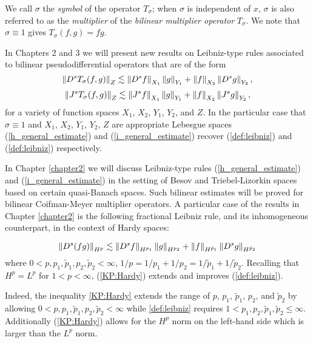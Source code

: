 We call $\sigma$ the \textit{symbol} of the operator $T_\sigma$; when $\sigma$ is independent of $x$, $\sigma$ is also referred to as the \textit{multiplier} of the \textit{bilinear multiplier operator} $T_\sigma$. We note that $\sigma \equiv 1$ gives $T_\sigma(f,g) = fg$. 


In Chapters 2 and 3 we will present new results on Leibniz-type rules associated to bilinear pseudodifferential operators that are of the form 
\begin{equation}\label{h_general_estimate}
\left\|D^s T_\sigma(f,g)\right\|_{Z} \lesssim \left\|D^sf\right\|_{X_1}\left\|g\right\|_{Y_1} + \left\|f\right\|_{X_2}\left\|D^s g\right\|_{Y_2} ,
\end{equation}
\begin{equation}\label{i_general_estimate}
\left\|J^sT_\sigma(f,g)\right\|_{Z} \lesssim \left\|J^sf\right\|_{X_1}\left\|g\right\|_{Y_1} + \left\|f\right\|_{X_2}\left\|J^sg\right\|_{Y_2} ,
\end{equation}
for a variety of function spaces $X_1$, $X_2$, $Y_1$, $Y_2$, and $Z$. In the particular case that $\sigma \equiv 1$ and $X_1$, $X_2$, $Y_1$, $Y_2$, $Z$ are appropriate Lebesgue spaces (\ref{h_general_estimate}) and (\ref{i_general_estimate}) recover (\ref{def:leibniz}) and (\ref{def:leibniz}) respectively.

In Chapter \ref{chapter2} we will discuss Leibniz-type rules (\ref{h_general_estimate}) and (\ref{i_general_estimate}) in the setting of Besov and Triebel-Lizorkin spaces based on certain quasi-Banach spaces. Such bilinear estimates will be proved for bilinear Coifman-Meyer multiplier operators. A particular case of the results in Chapter \ref{chapter2} is the following fractional Leibniz rule, and its inhomogeneous counterpart, in the context of Hardy spaces:

\begin{equation}\label{KP:Hardy}
\left\|D^s(fg)\right\|_{H^p} \lesssim \left\|D^s f\right\|_{H^{p_1}} \left\|g\right\|_{H^{p_2}} +  \left\|f\right\|_{H^{\tilde{p}_1}}   \left\|D^s g\right\|_{H^{\tilde{p}_2}} 
\end{equation}
where $0<p,p_1,\tilde{p}_1, p_2, \tilde{p}_2 <\infty$, $1/p = 1/p_1 + 1/p_2 = 1/\tilde{p}_1 + 1/\tilde{p}_2$. Recalling that $H^p = L^p$ for $1<p<\infty$, (\ref{KP:Hardy}) extends and improves (\ref{def:leibniz}). 


 Indeed, the inequality \eqref{KP:Hardy} extends the range of $p$, $p_1$, $\tilde{p}_1$, $p_2$, and $\tilde{p}_2$ by allowing $0<p,p_1,\tilde{p}_1,p_2,\tilde{p}_2<\infty$ while \eqref{def:leibniz} requires $1<p_1,p_2,\tilde{p}_1, \tilde{p}_2\leq \infty$. Additionally (\ref{KP:Hardy}) allows for the $H^p$ norm on the left-hand side which is larger than the $L^p$ norm. 
  
